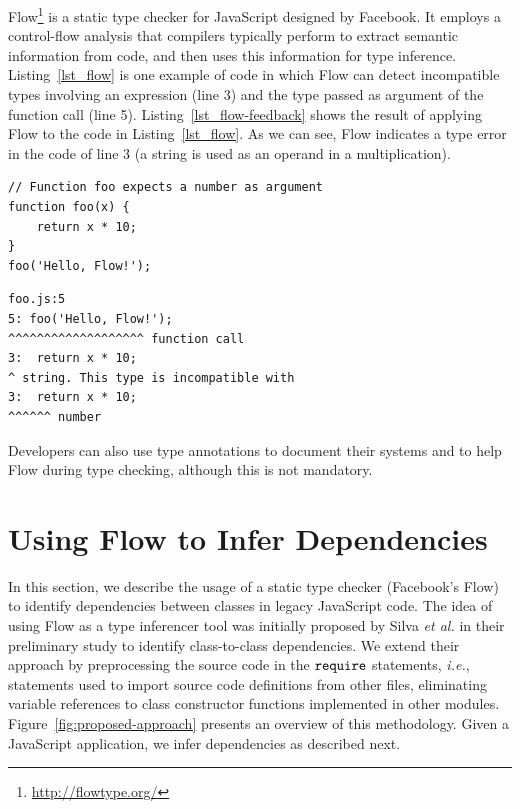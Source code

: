 \documentclass[review]{elsarticle}
\newcommand{\mcode}[1]{$\tt #1$}
\begin{document}
Flow\footnote{\url{http://flowtype.org/}} is a static type checker for JavaScript designed by Facebook. It employs a control-flow analysis that compilers typically perform to extract semantic information from code, and then uses this information for type inference. Listing~\ref{lst_flow} is one example of code in which Flow can detect incompatible types involving an expression (line 3) and the type passed as argument of the function call (line 5). Listing~\ref{lst_flow-feedback} shows the result of applying Flow to the code in Listing~\ref{lst_flow}. As we can see, Flow indicates a type error in the code of line 3 (a string is used as an operand in a multiplication).


\begin{lstlisting}[caption=Example of incompatible types detected by Flow, label=lst_flow]
// Function foo expects a number as argument
function foo(x) {  
	return x * 10;
}
foo('Hello, Flow!');
\end{lstlisting} 

\begin{lstlisting}[caption=Warning messages from Flow for the code in Listing~\ref{lst_flow}, label=lst_flow-feedback]
foo.js:5
5: foo('Hello, Flow!');
^^^^^^^^^^^^^^^^^^^ function call
3: 	return x * 10;
^ string. This type is incompatible with
3: 	return x * 10;
^^^^^^ number
\end{lstlisting} 

Developers can also use type annotations to document their systems and to help Flow during type checking, although this is not mandatory.


\section{Using Flow to Infer Dependencies}
\label{sec:approach}

In this section, we describe the usage of a static type checker (Facebook's Flow) to identify dependencies between classes in legacy JavaScript code. The idea of using Flow as a type inferencer tool was initially proposed by Silva \emph{et al.} \cite{sanerera2017} in their preliminary study to identify class-to-class dependencies. We extend their approach by preprocessing the source code in the \mcode{require} statements, \emph{i.e.}, statements used to import source code definitions from other files, eliminating variable references to class constructor functions implemented in other modules. Figure~\ref{fig:proposed-approach} presents an overview of this methodology. Given a JavaScript application, we infer dependencies as described next.
\end{document}

